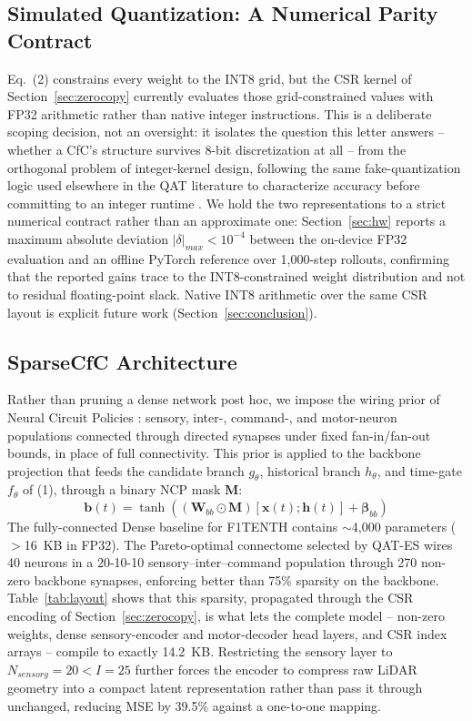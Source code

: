 \documentclass[10pt,journal]{IEEEtran}
\begin{document}
\subsection{Simulated Quantization: A Numerical Parity Contract}
\label{sec:simquant}

Eq.~(2) constrains every weight to the INT8 grid, but the CSR kernel of Section~\ref{sec:zerocopy} currently evaluates those grid-constrained values with FP32 arithmetic rather than native integer instructions. This is a deliberate scoping decision, not an oversight: it isolates the question this letter answers -- whether a CfC's structure survives 8-bit discretization at all -- from the orthogonal problem of integer-kernel design, following the same fake-quantization logic used elsewhere in the QAT literature to characterize accuracy before committing to an integer runtime \cite{hubara2017,jacob2018}. We hold the two representations to a strict numerical contract rather than an approximate one: Section~\ref{sec:hw} reports a maximum absolute deviation $|\delta|_{max}<10^{-4}$ between the on-device FP32 evaluation and an offline PyTorch reference over 1,000-step rollouts, confirming that the reported gains trace to the INT8-constrained weight distribution and not to residual floating-point slack. Native INT8 arithmetic over the same CSR layout is explicit future work (Section~\ref{sec:conclusion}).

\subsection{SparseCfC Architecture}

Rather than pruning a dense network post hoc, we impose the wiring prior of Neural Circuit Policies \cite{lechner2020}: sensory, inter-, command-, and motor-neuron populations connected through directed synapses under fixed fan-in/fan-out bounds, in place of full connectivity. This prior is applied to the backbone projection that feeds the candidate branch $g_\theta$, historical branch $h_\theta$, and time-gate $f_\theta$ of (1), through a binary NCP mask $\mathbf{M}$:
\begin{equation}
\mathbf{b}(t)=\tanh\!\left((\mathbf{W}_{bb}\odot\mathbf{M})[\mathbf{x}(t);\mathbf{h}(t)]+\boldsymbol\beta_{bb}\right)
\end{equation}
The fully-connected Dense baseline for F1TENTH contains $\sim$4,000 parameters ($>$16~KB in FP32). The Pareto-optimal connectome selected by QAT-ES wires 40 neurons in a 20-10-10 sensory--inter--command population through 270 non-zero backbone synapses, enforcing better than 75\% sparsity on the backbone. Table~\ref{tab:layout} shows that this sparsity, propagated through the CSR encoding of Section~\ref{sec:zerocopy}, is what lets the complete model -- non-zero weights, dense sensory-encoder and motor-decoder head layers, and CSR index arrays -- compile to exactly 14.2~KB. Restricting the sensory layer to $N_{sensory}=20<I=25$ further forces the encoder to compress raw LiDAR geometry into a compact latent representation rather than pass it through unchanged, reducing MSE by 39.5\% against a one-to-one mapping.
\end{document}
